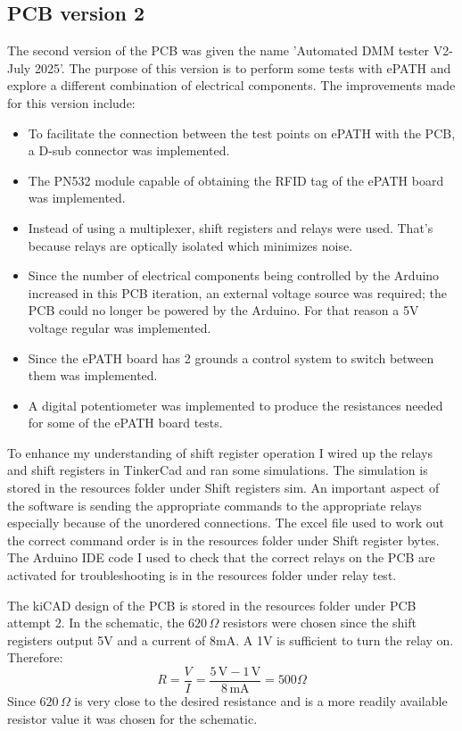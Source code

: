 \subsection{PCB version 2}
The second version of the PCB was given the name 'Automated DMM tester V2-July 2025'. The purpose of this version is to perform some tests with ePATH and explore a different combination of electrical components. The improvements made for this version include:
\begin{itemize}
\item To facilitate the connection between the test points on ePATH with the PCB, a D-sub connector was implemented.
\item The PN532 module capable of obtaining the RFID tag of the ePATH board was implemented.
\item Instead of using a multiplexer, shift registers and relays were used. That's because relays are optically isolated which minimizes noise. 
\item Since the number of electrical components being controlled by the Arduino increased in this PCB iteration, an external voltage source was required; the PCB could no longer be powered by the Arduino. For that reason a 5V voltage regular was implemented.
\item Since the ePATH board has 2 grounds a control system to switch between them was implemented.
\item A digital potentiometer was implemented to produce the resistances needed for some of the ePATH board tests.
\end{itemize}

To enhance my understanding of shift register operation I wired up the relays and shift registers in TinkerCad and ran some simulations. The simulation is stored in the resources folder under Shift registers sim. An important aspect of the software is sending the appropriate commands to the appropriate relays especially because of the unordered connections. The excel file used to work out the correct command order is in the resources folder under Shift register bytes. The Arduino IDE code I used to check that the correct relays on the PCB are activated for troubleshooting is in the resources folder under relay test.

The kiCAD design of the PCB is stored in the resources folder under PCB attempt 2. In the schematic, the $620\,\Omega$ resistors were chosen since the shift registers output 5V and a current of 8mA. A 1V is sufficient to turn the relay on. Therefore:
\[
R = \frac{V}{I} = \frac{5\,\mathrm{V} - 1\,\mathrm{V}}{8\,\mathrm{mA}}=500\Omega
\]
Since $620\,\Omega$ is very close to the desired resistance and is a more readily available resistor value it was chosen for the schematic.

